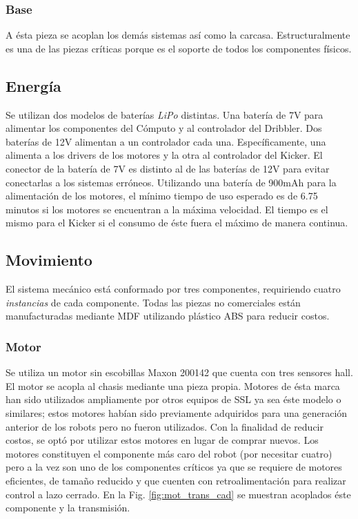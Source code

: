 \subsubsection{Base}
A ésta pieza se acoplan los demás sistemas así como la carcasa. Estructuralmente es una de las piezas críticas porque es el soporte de todos los componentes físicos.

\subsection{Energía}
Se utilizan dos modelos de baterías \textit{LiPo} distintas. Una batería de 7V para alimentar los componentes del Cómputo y al controlador del \gls{Dribbler}. Dos baterías de 12V alimentan a un controlador cada una. Específicamente, una alimenta a los drivers de los motores y la otra al controlador del \gls{Kicker}. El conector de la batería de 7V es distinto al de las baterías de 12V para evitar conectarlas a los sistemas erróneos. Utilizando una batería de 900mAh para la alimentación de los motores, el mínimo tiempo de uso esperado es de 6.75 minutos si los motores se encuentran a la máxima velocidad. El tiempo es el mismo para el \gls{Kicker} si el consumo de éste fuera el máximo de manera continua. 




\subsection{Movimiento}
El sistema mecánico está conformado por tres componentes, requiriendo cuatro \textit{instancias} de cada componente. Todas las piezas no comerciales están manufacturadas mediante \gls{MDF} utilizando plástico \gls{ABS} para reducir costos.

\subsubsection{Motor}
Se utiliza un motor sin escobillas Maxon 200142 \cite{maxon_motor} que cuenta con tres sensores hall. El motor se acopla al chasis mediante una pieza propia. Motores de ésta marca han sido utilizados ampliamente por otros equipos de \gls{SSL} ya sea éste modelo o similares; estos motores habían sido previamente adquiridos para una generación anterior de los robots pero no fueron utilizados. Con la finalidad de reducir costos, se optó por utilizar estos motores en lugar de comprar nuevos. Los motores constituyen el componente más caro del robot (por necesitar cuatro) pero a la vez son uno de los componentes críticos ya que se requiere de motores eficientes, de tamaño reducido y que cuenten con retroalimentación para realizar control a lazo cerrado. En la Fig. \ref{fig:mot_trans_cad} se muestran acoplados éste componente y la transmisión.

